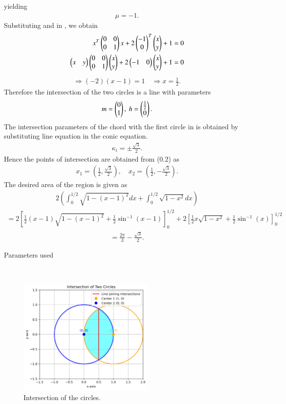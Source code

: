 \documentclass[journal]{IEEEtran}
\begin{document}
yielding
 \begin{align}
\mu = -1.
 \end{align}
Substituting  and  in , we obtain
 \begin{align}
x^T \begin{pmatrix} 0 & 0 \\ 0 & 1\end{pmatrix} x + 2 \begin{pmatrix} -1 \\ 0\end{pmatrix}^T \begin{pmatrix} x \\ y\end{pmatrix} + 1 = 0 \\
 \begin{pmatrix}x & y\end{pmatrix} \begin{pmatrix}0 & 0 \\ 0 & 1\end{pmatrix} \begin{pmatrix}x \\ y\end{pmatrix}+2 \begin{pmatrix}-1 & 0\end{pmatrix} \begin{pmatrix}x \\ y\end{pmatrix}+1=0
 \end{align}
 \begin{align}
\Rightarrow (-2)(x-1) = 1 \quad \Rightarrow x = \frac{1}{2}. 
 \end{align}
Therefore the intersection of the two circles is a line with parameters
 \begin{align}
m = \begin{pmatrix}0 \\ 1\end{pmatrix}, \ h = \begin{pmatrix}\frac{1}{2} \\ 0\end{pmatrix}. 
 \end{align}
The intersection parameters of the chord with the first circle in is obtained by substituting line equation in the conic equation.
 \begin{align}
\kappa_i = \pm \frac{\sqrt{3}}{2}. 
 \end{align}
Hence the points of intersection are obtained from (0.2) as
 \begin{align}
x_1 = \left( \frac{1}{2}, \frac{\sqrt{3}}{2} \right), \quad x_2 = \left( \frac{1}{2}, -\frac{\sqrt{3}}{2} \right). 
 \end{align}
The desired area of the region is given as
 \begin{align}
2 \left( \int_0^{1/2} \sqrt{1 - (x - 1)^2} dx + \int_0^{1/2} \sqrt{1 - x^2} dx \right)
 \end{align}
 \begin{align}
= 2 \left[ \frac{1}{2} \left( x - 1 \right) \sqrt{1 - (x - 1)^2} + \frac{1}{2} \sin^{-1}(x - 1) \right]_0^{1/2} + 2 \left[ \frac{1}{2} x \sqrt{1 - x^2} + \frac{1}{2} \sin^{-1}(x) \right]_0^{1/2}
 \end{align}
 \begin{align}
= \frac{2\pi}{3} - \frac{\sqrt{3}}{2}. 
 \end{align} 
\begin{table}[h!]
    \centering
    
    \caption{Parameters used}
    \label{tab:9.5-5}
\end{table}
\\
\begin{figure}[h]
    \centering
    \includegraphics[width=0.6\textwidth]{fig.png}
    \caption{Intersection of the circles.}
\end{figure}
\end{document}
